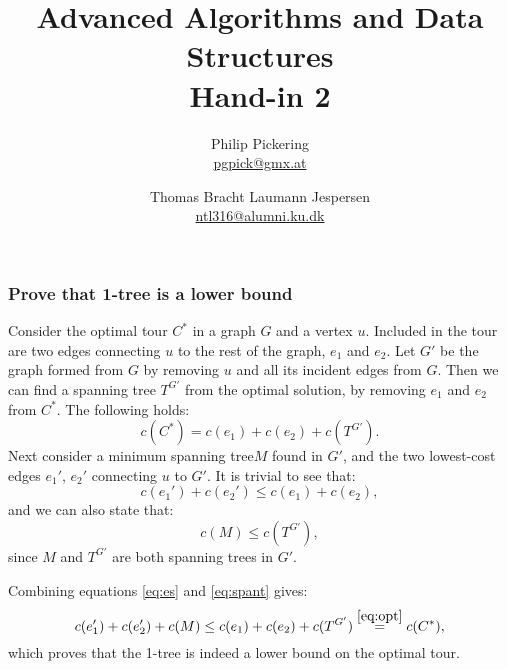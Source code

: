 \documentclass{article}
\author{Philip Pickering\\\url{pgpick@gmx.at} \and Thomas Bracht Laumann Jespersen\\\url{ntl316@alumni.ku.dk}}
\title{Advanced Algorithms and Data Structures\\Hand-in 2}
\date{}
\newcommand{\mst}{minimum spanning tree\xspace}
\begin{document}
\maketitle


\subsubsection*{Prove that 1-tree is a lower bound}

Consider the optimal tour $C^*$ in a graph $G$ and a vertex
$u$. Included in the tour are two edges connecting $u$ to the rest of
the graph, $e_1$ and $e_2$. Let $G'$ be the graph formed from $G$ by
removing $u$ and all its incident edges from $G$. Then we can find a
spanning tree $T^{G'}$ from the optimal solution, by removing
$e_1$ and $e_2$ from $C^*$. The following holds:
\begin{equation}
  c(C^*) = c(e_1) + c(e_2) + c(T^{G'}).\label{eq:opt}
\end{equation}
Next consider a \mst $M$ found in $G'$, and the two lowest-cost
edges $e_1'$, $e_2'$ connecting $u$ to $G'$. It is trivial to see
that:
\begin{equation}
  c(e_1') + c(e_2') \leq c(e_1) + c(e_2),\label{eq:es}
\end{equation}
and we can also state that:
\begin{equation}
  c(M) \leq c(T^{G'}),\label{eq:spant}
\end{equation}
since $M$ and $T^{G'}$ are both spanning trees in $G'$.

Combining equations \eqref{eq:es} and \eqref{eq:spant} gives:
\begin{equation}
  c(e_1') + c(e_2') + c(M) \leq c(e_1) + c(e_2) + c(T^{G'}) \stackrel{\eqref{eq:opt}}{=} c(C^*),
\end{equation}
which proves that the 1-tree is indeed a lower bound on the
optimal tour.
\end{document}
